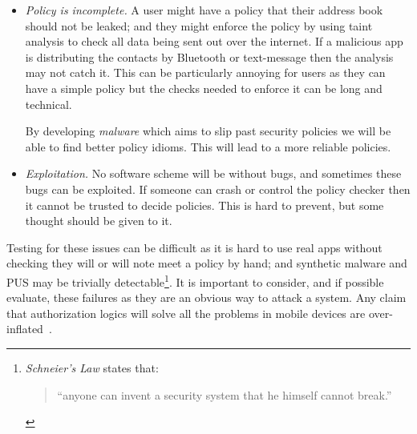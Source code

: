 \documentclass[a4paper]{article}
\begin{document}
\begin{description}
\begin{itemize}
        This kind of failure will lead to decisions being authorized which
        shouldn't have been. How this affects the security of the device and
        knowing what must be done to recover from it is important for policies
        to be resiliant.  A variation of this might be an service which stops
        decisions being authorized.  For example, suppose a video streaming
        service bribed an antivirus service to say all its competitors were
        malicious.  Knowing how to recover from this (especially after a user
        may have installed the video streamer out of frustration) is not
        obvious\footnote{Though perhaps a similar solution to Microsoft's
        Internet Explorer being compelled to advertise alternatives might work
          well.}.

      \item \emph{Policy is incomplete.}  A user might have a policy that their
        address book should not be leaked; and they might enforce the policy by
        using taint analysis to check all data being sent out over the internet.
        If a malicious app is distributing the contacts by Bluetooth or
        text-message then the analysis may not catch it.  This can be
        particularly annoying for users as they can have a simple policy but the
        checks needed to enforce it can be long and technical.

        By developing \emph{malware} which aims to slip past security
        policies we will be able to find better policy idioms.  This will lead
        to a more reliable policies.

      \item \emph{Exploitation.}  No software scheme will be without bugs, and
        sometimes these bugs can be exploited.  If someone can crash or control
        the policy checker then it cannot be trusted to decide policies.
        This is hard to prevent, but some thought should be given to it.
    
    \end{itemize}
  
    Testing for these issues can be difficult as it is hard to use real apps
    without checking they will or will note meet a policy by hand; and synthetic
    malware and \ac{PUS} may be trivially detectable\footnote{\emph{Schneier's
    Law}\cite{Schneier:ws} states that: \begin{quote}``anyone can invent a security
      system that he himself cannot break.''\end{quote}}.  It is important to
    consider, and if possible evaluate, these failures as they are an obvious
    way to attack a system.  Any claim that authorization logics will solve all
    the problems in mobile devices are over-inflated~\cite{Kruger:1999dd}.

\end{description}
\end{document}
